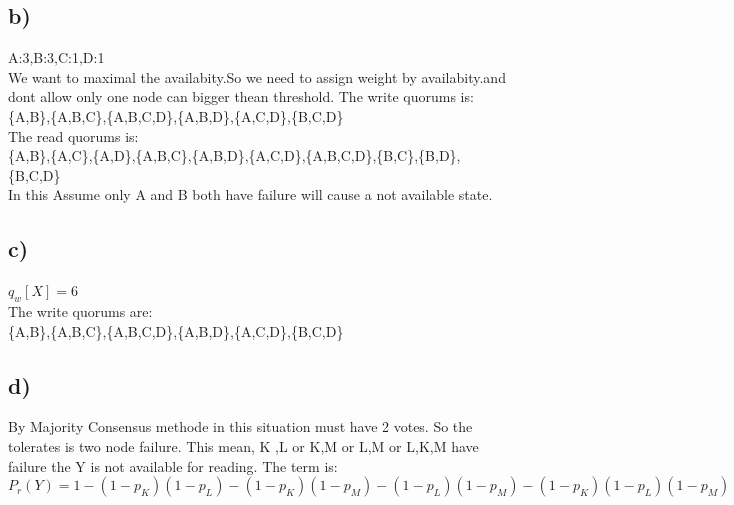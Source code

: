 \documentclass{article}
\begin{document}
\subsection*{b)}
A:3,B:3,C:1,D:1
\\
 We want to maximal the availabity.So we need to assign weight by availabity.and dont allow only one node can bigger thean threshold.
 The write quorums is:
 \\\{A,B\},\{A,B,C\},\{A,B,C,D\},\{A,B,D\},\{A,C,D\},\{B,C,D\}
 \\The read quorums is:
 \\\{A,B\},\{A,C\},\{A,D\},\{A,B,C\},\{A,B,D\},\{A,C,D\},\{A,B,C,D\},\{B,C\},\{B,D\},\{B,C,D\}
 \\In this Assume only A and B both have failure will cause a not available state.
 
\subsection*{c)}
$q_w[X]=6$
\\The write quorums are:
\\\{A,B\},\{A,B,C\},\{A,B,C,D\},\{A,B,D\},\{A,C,D\},\{B,C,D\}
\subsection*{d)}
By Majority Consensus methode in this situation must have 2 votes. So the tolerates is two node failure.
This mean, K ,L or K,M or L,M or L,K,M have failure the Y is not available for reading. The term is:
\[P_r(Y)=1-(1-p_K)(1-p_L)-(1-p_K)(1-p_M)-(1-p_L)(1-p_M)-(1-p_K)(1-p_L)(1-p_M)\]
\end{document}

